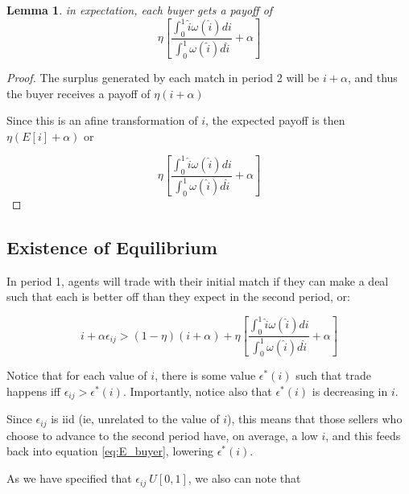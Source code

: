 \documentclass[WP]{AEA}
\newtheorem{lemma}{Lemma}
\begin{document}
\begin{lemma}
	in expectation, each buyer gets a payoff of 
	\begin{equation} \label{eq:E_buyer}
		\eta  \left[ \frac{\int_0^1 \hat{i} \omega(\hat{i}) di}{\int_0^1  \omega(\hat{i}) d\hat{i} } + \alpha \right]
	\end{equation}
\end{lemma}

\begin{proof}
	The surplus generated by each match in period 2 will be $i + \alpha$, and thus 
	the buyer receives a payoff of $\eta(i+\alpha)$
	
	Since this is an afine transformation of $i$, the expected payoff is then $\eta(E[i]+\alpha)$ or 



$$\eta \left[ \frac{\int_0^1 \hat{i} \omega(\hat{i}) di}{\int_0^1  \omega(\hat{i}) d\hat{i}} + \alpha \right] $$


\end{proof}


\subsection{Existence of Equilibrium}

In period 1, agents will trade with their initial match if they can make a deal such that each is better off than they expect in the second period, or:

\begin{equation} \label{eq:ec_condition_raw}
 i+\alpha \epsilon_{ij} >(1-\eta)(i+\alpha ) + \eta  \left[ \frac{\int_0^1 \hat{i} \omega(\hat{i}) di}{\int_0^1  \omega(\hat{i}) d\hat{i}} + \alpha \right] 
 \end{equation}

Notice that for each value of $i$, there is some value $\epsilon^* (i)$ such that trade happens iff $\epsilon_{ij} > \epsilon^* (i)$.  Importantly, notice also that $\epsilon^* (i)$ is decreasing in $i$.

Since $\epsilon_{ij}$ is iid (ie, unrelated to the value of $i$), this means that those sellers who choose to advance to the second period have, on average, a low $i$, and this feeds back into equation \ref{eq:E_buyer}, lowering  $\epsilon^* (i)$. 


As we have specified that $\epsilon_{ij} ~ U[0,1]$, we also can note that 
\end{document}
